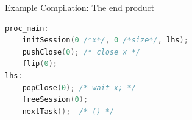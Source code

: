 \documentclass{beamer}
\begin{document}

\begin{frame}[fragile]{Example Compilation: The end product}
  \begin{class}
  \end{class}
  \begin{lstlisting}[language=C]
proc_main:
    initSession(0 /*x*/, 0 /*size*/, lhs);
    pushClose(0); /* close x */
    flip(0);
lhs:
    popClose(0); /* wait x; */
    freeSession(0);
    nextTask();  /* () */
  \end{lstlisting}
\end{frame}




\end{document}
